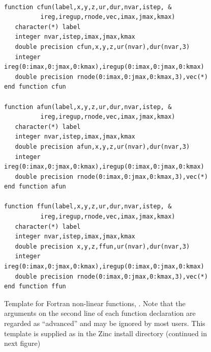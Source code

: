 \documentclass[a4paper,twoside,11pt]{book}
\begin{document}
\begin{figure}
\begin{verbatim}

function cfun(label,x,y,z,ur,dur,nvar,istep, &
          ireg,iregup,rnode,vec,imax,jmax,kmax)
   character(*) label
   integer nvar,istep,imax,jmax,kmax
   double precision cfun,x,y,z,ur(nvar),dur(nvar,3)
   integer ireg(0:imax,0:jmax,0:kmax),iregup(0:imax,0:jmax,0:kmax)
   double precision rnode(0:imax,0:jmax,0:kmax,3),vec(*)
end function cfun
     
function afun(label,x,y,z,ur,dur,nvar,istep, &
          ireg,iregup,rnode,vec,imax,jmax,kmax)
   character(*) label
   integer nvar,istep,imax,jmax,kmax
   double precision afun,x,y,z,ur(nvar),dur(nvar,3)
   integer ireg(0:imax,0:jmax,0:kmax),iregup(0:imax,0:jmax,0:kmax)
   double precision rnode(0:imax,0:jmax,0:kmax,3),vec(*)
end function afun

function ffun(label,x,y,z,ur,dur,nvar,istep, &
          ireg,iregup,rnode,vec,imax,jmax,kmax)
   character(*) label  
   integer nvar,istep,imax,jmax,kmax
   double precision x,y,z,ffun,ur(nvar),dur(nvar,3)
   integer ireg(0:imax,0:jmax,0:kmax),iregup(0:imax,0:jmax,0:kmax)
   double precision rnode(0:imax,0:jmax,0:kmax,3),vec(*)
end function ffun

\end{verbatim}
\caption{Template for Fortran non-linear functions,
  . Note that the arguments on the second line of each
  function declaration are regarded as ``advanced'' and may be ignored
  by most users. This template is supplied as  in
  the Zinc install directory (continued in next figure)}
\label{template}
\end{figure}
\end{document}
